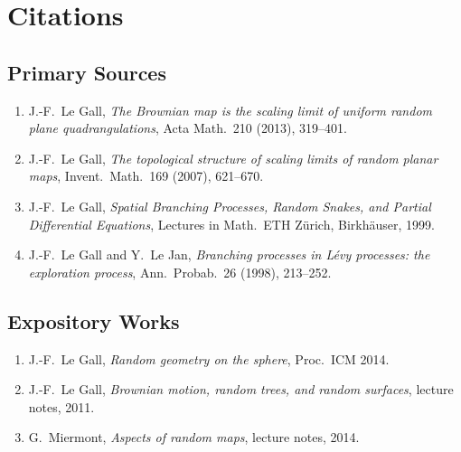 \section{Citations}\subsection*{Primary Sources}
\begin{enumerate}
    \item J.-F.\ Le Gall, \textit{The Brownian map is the scaling limit of uniform random plane quadrangulations}, Acta Math.\ 210 (2013), 319--401.
    \item J.-F.\ Le Gall, \textit{The topological structure of scaling limits of random planar maps}, Invent.\ Math.\ 169 (2007), 621--670.
    \item J.-F.\ Le Gall, \textit{Spatial Branching Processes, Random Snakes, and Partial Differential Equations}, Lectures in Math.\ ETH Z\"urich, Birkh\"auser, 1999.
    \item J.-F.\ Le Gall and Y.\ Le Jan, \textit{Branching processes in L\'evy processes: the exploration process}, Ann.\ Probab.\ 26 (1998), 213--252.
\end{enumerate}

\subsection*{Expository Works}
\begin{enumerate}
    \item J.-F.\ Le Gall, \textit{Random geometry on the sphere}, Proc.\ ICM 2014.
    \item J.-F.\ Le Gall, \textit{Brownian motion, random trees, and random surfaces}, lecture notes, 2011.
    \item G.\ Miermont, \textit{Aspects of random maps}, lecture notes, 2014.
\end{enumerate}

